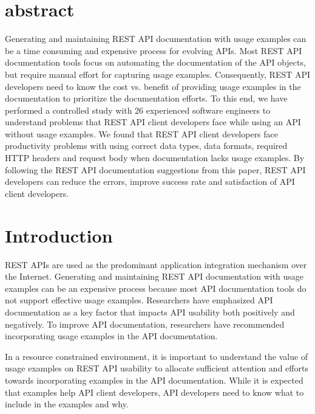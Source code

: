 \section{abstract}
Generating and maintaining REST API documentation with usage examples can be a time consuming and expensive process for evolving APIs. Most REST API documentation tools focus on automating the documentation of the API objects, but require manual effort for capturing usage examples. Consequently, REST API developers need to know the cost vs. benefit of providing usage examples in the documentation to prioritize the documentation efforts. To this end, we have performed a controlled study with 26 experienced software engineers to understand problems that REST API client developers face while using an API without usage examples. We found that REST API client developers face productivity problems with using correct data types, data formats, required HTTP headers and request body when documentation lacks usage examples. By following the REST API documentation suggestions from this paper, REST API developers can reduce the errors, improve success rate and satisfaction of API client developers.







\section{Introduction}
REST APIs are used as the predominant application integration mechanism over the Internet. Generating and maintaining REST API documentation with usage examples can be an expensive process because most API documentation tools do not support effective usage examples. Researchers have emphasized API documentation as a key factor that impacts API usability both positively and negatively. To improve API documentation, researchers have recommended incorporating usage examples in the API documentation.

In a resource constrained environment, it is important to understand the value of usage examples on REST API usability to allocate sufficient attention and efforts towards incorporating examples in the API documentation. While it is expected that examples help API client developers, API developers need to know what to include in the examples and why.

